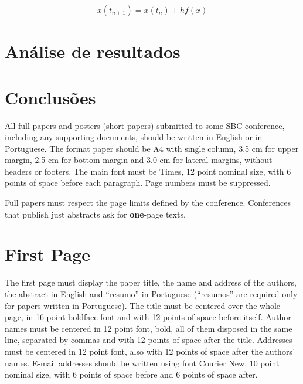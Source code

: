 \documentclass[12pt]{article}
\begin{document}

\begin{equation}
  x(t_{n+1}) = x(t_{n}) + h f(x) %
\end{equation}


\section{Análise de resultados}


\section{Conclusões}




All full papers and posters (short papers) submitted to some SBC conference,
including any supporting documents, should be written in English or in
Portuguese. The format paper should be A4 with single column, 3.5 cm for upper
margin, 2.5 cm for bottom margin and 3.0 cm for lateral margins, without
headers or footers. The main font must be Times, 12 point nominal size, with 6
points of space before each paragraph. Page numbers must be suppressed.

Full papers must respect the page limits defined by the conference.
Conferences that publish just abstracts ask for \textbf{one}-page texts.

\section{First Page} \label{sec:firstpage}

The first page must display the paper title, the name and address of the
authors, the abstract in English and ``resumo'' in Portuguese (``resumos'' are
required only for papers written in Portuguese). The title must be centered
over the whole page, in 16 point boldface font and with 12 points of space
before itself. Author names must be centered in 12 point font, bold, all of
them disposed in the same line, separated by commas and with 12 points of
space after the title. Addresses must be centered in 12 point font, also with
12 points of space after the authors' names. E-mail addresses should be
written using font Courier New, 10 point nominal size, with 6 points of space
before and 6 points of space after.
\end{document}
